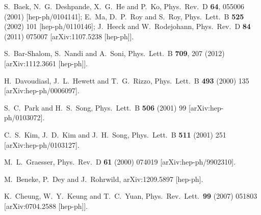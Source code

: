 \begin{thebibliography}{99}
  S.~Baek, N.~G.~Deshpande, X.~G.~He and P.~Ko,
  Phys.\ Rev.\ D {\bf 64}, 055006 (2001)
  [hep-ph/0104141];
  E.~Ma, D.~P.~Roy and S.~Roy,
  Phys.\ Lett.\ B {\bf 525} (2002) 101
  [hep-ph/0110146];
%
  J.~Heeck and W.~Rodejohann,
  Phys.\ Rev.\ D {\bf 84} (2011) 075007
  [arXiv:1107.5238 [hep-ph]].

  S.~Bar-Shalom, S.~Nandi and A.~Soni,
  Phys.\ Lett.\ B {\bf 709}, 207 (2012)
  [arXiv:1112.3661 [hep-ph]].


  H.~Davoudiasl, J.~L.~Hewett and T.~G.~Rizzo,
  Phys.\ Lett.\  B {\bf 493} (2000) 135
  [arXiv:hep-ph/0006097].

S.~C.~Park and H.~S.~Song,
Phys.\ Lett.\  B {\bf 506} (2001) 99 [arXiv:hep-ph/0103072].

  C.~S.~Kim, J.~D.~Kim and J.~H.~Song,
  Phys.\ Lett.\  B {\bf 511} (2001) 251
  [arXiv:hep-ph/0103127].

  M.~L.~Graesser,
  Phys.\ Rev.\  D {\bf 61} (2000) 074019
  [arXiv:hep-ph/9902310].

  M.~Beneke, P.~Dey and J.~Rohrwild,
  arXiv:1209.5897 [hep-ph].

K.~Cheung, W.~Y.~Keung and T.~C.~Yuan,
Phys.\ Rev.\ Lett.\  {\bf 99} (2007) 051803 [arXiv:0704.2588
[hep-ph]].


\end{thebibliography}
